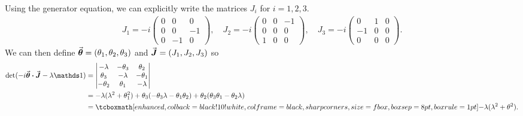 Using the generator equation, we can explicitly write the matrices $J_{i}$ for $i = 1,2,3$.
\begin{eqnarray}
    \label{eq:J-matrices}
    J_{1} = -i
    \begin{pmatrix}
    0 & 0 & 0 \\
    0 & 0 & -1 \\
    0 & -1 & 0
    \end{pmatrix},
    \quad
    J_{2} = -i
    \begin{pmatrix}
    0 & 0 & -1 \\
    0 & 0 & 0 \\
    1 & 0 & 0
    \end{pmatrix},
    \quad
    J_{3} = -i
    \begin{pmatrix}
    0 & 1 & 0 \\
    -1 & 0 & 0 \\
    0 & 0 & 0
    \end{pmatrix}
.\end{eqnarray}
We can then define $\va*{\theta} = (\theta_1,\theta_2,\theta_3)$ and $\va*{J} = (J_1,J_2,J_3)$ so
\begin{align}
    \label{eq:characteristic-eq}
    {\rm det}(-i \va*{\theta} \vdot \va*{J} - \lambda \id) &= 
    \begin{vmatrix}
        -\lambda & -\theta_3 & \theta_2 \\
        \theta_3 & -\lambda & -\theta_1 \\
        -\theta_2 & \theta_1 & -\lambda
    \end{vmatrix}
    \\
                                                           &=
    -\lambda(\lambda^2 + \theta_1^2) + \theta_3(-\theta_3\lambda - \theta_1\theta_2) + \theta_2(\theta_3\theta_1 - \theta_2\lambda) \\
                                                           &= \eqbox{-\lambda(\lambda^2 + \theta^2)}
.\end{align}





